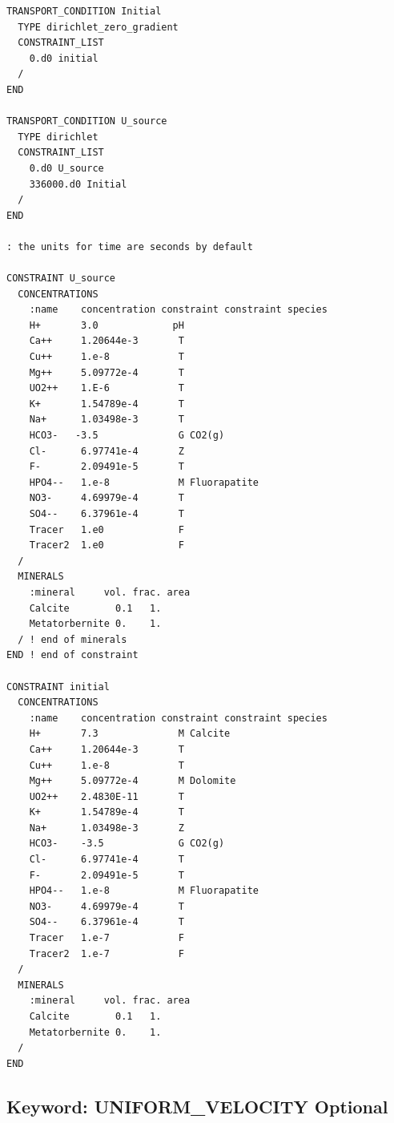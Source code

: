 \begin{mdframed}

\footnotesize

\begin{verbatim}
TRANSPORT_CONDITION Initial
  TYPE dirichlet_zero_gradient
  CONSTRAINT_LIST
    0.d0 initial
  /
END

TRANSPORT_CONDITION U_source
  TYPE dirichlet
  CONSTRAINT_LIST
    0.d0 U_source
    336000.d0 Initial
  /
END

: the units for time are seconds by default

CONSTRAINT U_source
  CONCENTRATIONS
    :name    concentration constraint constraint species
    H+       3.0             pH
    Ca++     1.20644e-3       T
    Cu++     1.e-8            T
    Mg++     5.09772e-4       T
    UO2++    1.E-6            T
    K+       1.54789e-4       T
    Na+      1.03498e-3       T
    HCO3-   -3.5              G CO2(g)
    Cl-      6.97741e-4       Z
    F-       2.09491e-5       T
    HPO4--   1.e-8            M Fluorapatite
    NO3-     4.69979e-4       T
    SO4--    6.37961e-4       T
    Tracer   1.e0             F
    Tracer2  1.e0             F
  /
  MINERALS
    :mineral     vol. frac. area
    Calcite        0.1   1.
    Metatorbernite 0.    1.
  / ! end of minerals
END ! end of constraint

CONSTRAINT initial
  CONCENTRATIONS
    :name    concentration constraint constraint species
    H+       7.3              M Calcite
    Ca++     1.20644e-3       T
    Cu++     1.e-8            T
    Mg++     5.09772e-4       M Dolomite
    UO2++    2.4830E-11       T
    K+       1.54789e-4       T
    Na+      1.03498e-3       Z
    HCO3-    -3.5             G CO2(g)
    Cl-      6.97741e-4       T
    F-       2.09491e-5       T
    HPO4--   1.e-8            M Fluorapatite
    NO3-     4.69979e-4       T
    SO4--    6.37961e-4       T
    Tracer   1.e-7            F
    Tracer2  1.e-7            F
  /
  MINERALS
    :mineral     vol. frac. area
    Calcite        0.1   1.
    Metatorbernite 0.    1.
  /
END
\end{verbatim}
\normalsize
\end{mdframed}

\hyperlink{target_key}{\return}


\newpage
\protect\hypertarget{target_unifvel}{}

\subsection{Keyword: UNIFORM\_VELOCITY \hfill Optional}

